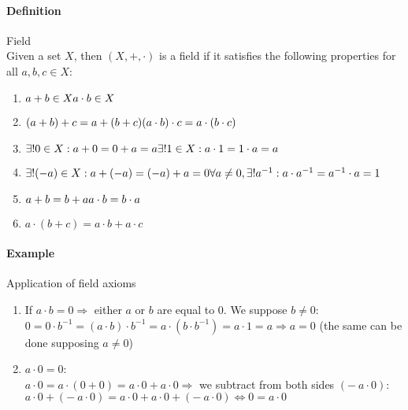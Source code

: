 \documentclass{article}
\newcommand{\Def}{\paragraph{Definition}}
\newcommand{\Example}{\paragraph{Example}}
\begin{document}
  \Def Field
\\Given a set $X$, then $(X, +, \cdot)$ is a field if it satisfies the following
  properties for all $a, b, c \in X$:
  \begin{enumerate}[label=(\roman*)]
    \item
    $a + b \in X
  \\a \cdot b \in X$

    \item
    $(a + b) + c = a + (b + c)
  \\(a \cdot b) \cdot c = a \cdot (b \cdot c)$

    \item
    $\exists! 0 \in X : a + 0 = 0 + a = a
  \\\exists! 1 \in X : a \cdot 1 = 1 \cdot a = a$

    \item
    $\exists! (-a) \in X : a + (-a) = (-a) + a = 0
  \\\forall a \neq 0, \exists! a^{-1} : a \cdot a^{-1} = a^{-1} \cdot a = 1$

    \item
    $a + b = b + a
  \\a \cdot b = b\cdot a$

    \item
    $a \cdot (b + c) = a \cdot b + a \cdot c$
  \end{enumerate}

  \Example Application of field axioms
  \begin{enumerate}[label=(\arabic*)]
    \item If $a \cdot b = 0 \Rightarrow$ either $a$ or $b$ are equal to 0. We
    suppose $b \neq 0$:
  \\$0 = 0 \cdot b^{-1} = (a \cdot b) \cdot b^{-1} = a \cdot (b \cdot b^{-1}) =
    a \cdot 1 = a \Rightarrow a = 0$ (the same can be done supposing $a \neq 0$)

    \item $a \cdot 0 = 0$:
  \\$a \cdot 0 = a \cdot (0 + 0) = a \cdot 0 + a \cdot 0 \Rightarrow$ we
    subtract from both sides $(- \ a \cdot 0)$:
  \\$a \cdot 0 + (- \ a \cdot 0) = a \cdot 0 + a \cdot 0 + (- \ a \cdot 0) \iff
    0 = a \cdot 0$
  \end{enumerate}
\end{document}

